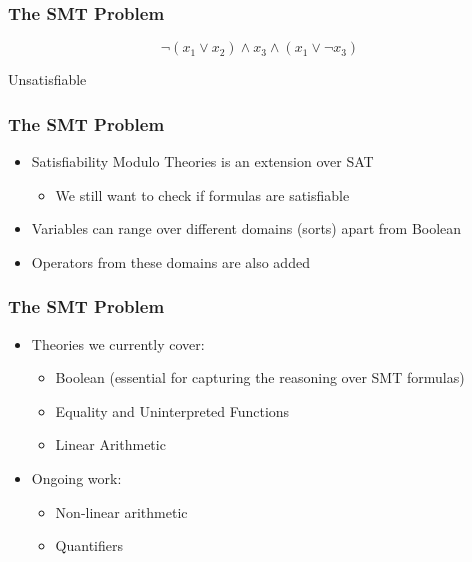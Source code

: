 \documentclass[usepdftitle=false,aspectratio=169,usenames,dvipsnames]{beamer}
\newcommand\vitem{\vfill\item}
\begin{document}
\begin{frame}
  \frametitle{The SMT Problem}
  \begin{overprint}
    \medskip
    $$\neg (x_{1} \vee x_{2}) \wedge x_{3} \wedge (x_{1} \vee \neg x_{3})$$
  \end{overprint}
  \vfill
  \begin{overprint}
    \begin{center}
      \color{red}Unsatisfiable
    \end{center}
  \end{overprint}
\end{frame}

\begin{frame}
  \frametitle{The SMT Problem}
  \begin{itemize}
    \item Satisfiability Modulo Theories is an extension over SAT
    \begin{itemize}
      \item We still want to check if formulas are satisfiable
    \end{itemize}
    \vitem Variables can range over different domains (sorts) apart from Boolean
    \vitem Operators from these domains are also added
  \end{itemize}
\end{frame}
\begin{frame}
  \frametitle{The SMT Problem}
  \begin{itemize}
    \item Theories we currently cover:
    \begin{itemize}
      \item Boolean (essential for capturing the reasoning over SMT formulas)
      \item Equality and Uninterpreted Functions
      \item Linear Arithmetic
    \end{itemize}
    \vitem Ongoing work:
    \begin{itemize}
      \item Non-linear arithmetic
      \item Quantifiers
    \end{itemize}
  \end{itemize}
\end{frame}
\end{document}
